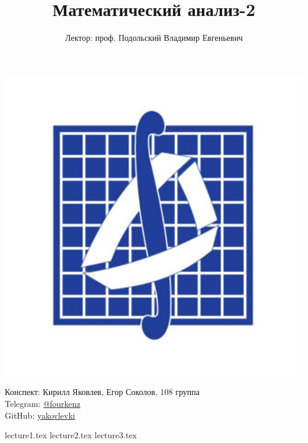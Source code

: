 \documentclass[a4paper, 12pt]{article}
\title{\textbf{Математический анализ-2}}
\author{Лектор: проф. Подольский Владимир Евгеньевич}
\begin{document}
    
\fontsize{14pt}{20pt}\selectfont
\maketitle
\vspace{0.3cm}
\begin{center}
    \includegraphics[width=0.75\linewidth]{Images/mehmat.png}
\end{center}
\vspace{1.5cm}
\begin{center}
    Конспект: Кирилл Яковлев, Егор Соколов, 108 группа\\
    Telegram: \href{https://t.me/fourkenz}{@fourkenz}\\
    GitHub: \href{https://github.com/yakovlevki}{yakovlevki}\\
\end{center}
    
\newpage
\tableofcontents
\newpage

{lecture1.tex}
{lecture2.tex}
{lecture3.tex}
\end{document}
